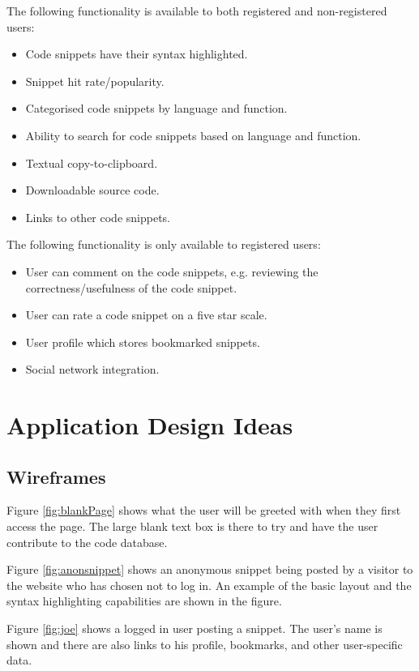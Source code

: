 \documentclass[11pt,a4paper]{article}
\begin{document}
The following functionality is available to both registered and
non-registered users:

\begin{itemize}
\item Code snippets have their syntax highlighted.
\item Snippet hit rate/popularity.
\item Categorised code snippets by language and function.
\item Ability to search for code snippets based on language and
function.
\item Textual copy-to-clipboard.
\item Downloadable source code.
\item Links to other code snippets.
\end{itemize}

The following functionality is only available to registered users:
\label{sec:restrict}

\begin{itemize}
\item User can comment on the code snippets, e.g. reviewing the
correctness/usefulness of the code snippet.
\item User can rate a code snippet on a five star scale.
\item User profile which stores bookmarked snippets.
\item Social network integration.
\end{itemize}

\newpage

\section{Application Design Ideas}

\subsection{Wireframes}

Figure \ref{fig:blankPage} shows what the user will be greeted with when they
first access the page. The large blank text box is there to try and have the
user contribute to the code database.

Figure \ref{fig:anonsnippet} shows an anonymous snippet being posted by a
visitor to the website who has chosen not to log in. An example of the basic
layout and the syntax highlighting capabilities are shown in the figure.

Figure \ref{fig:joe} shows a logged in user posting a snippet. The user's
name is shown and there are also links to his profile, bookmarks, and other
user-specific data.
\end{document}
